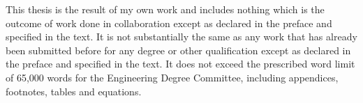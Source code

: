 
\begin{declaration}


This thesis is the result of my own work and includes nothing which is the outcome of work done in collaboration except as declared in the preface and specified in the text.
It is not substantially the same as any work that has already been submitted before for any degree or other qualification except as declared in the preface and specified in the text.
It does not exceed the prescribed word limit of 65,000 words for the Engineering Degree Committee, including appendices, footnotes, tables and equations. 


\end{declaration}

